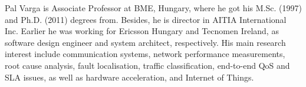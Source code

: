 \documentclass[journal]{IEEEtran}
\begin{document}
\begin{IEEEbiography}{Pal Varga}
 is Associate Professor at BME, Hungary, where he got his M.Sc. (1997) and Ph.D. (2011) degrees from. Besides, he is director in AITIA International Inc.  Earlier he was working for Ericsson Hungary and Tecnomen Ireland, as software design engineer and system architect, respectively.  His main research interest include communication systems, network performance measurements, root cause analysis, fault localisation, traffic classification, end-to-end QoS and SLA issues, as well as hardware acceleration, and Internet of Things.

\end{IEEEbiography}







%

%
%
\end{document}
